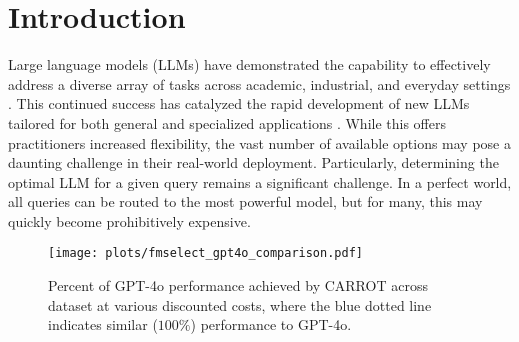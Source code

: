\section{Introduction}
\label{sec:intro}





Large language models (LLMs) have demonstrated the capability to effectively address a diverse array of tasks across academic, industrial, and everyday settings \citep{minaee2024large}. This continued success has catalyzed the rapid development of new LLMs tailored for both general and specialized applications \citep{myrzakhan2024open}. While %
this offers practitioners increased flexibility, the vast number of available options may pose a daunting challenge in their real-world deployment. Particularly, determining the optimal LLM for a given query remains a significant challenge. In a perfect world, all queries can be routed to the most powerful model, but for many, this may quickly become prohibitively expensive.

\begin{figure}[h]
    \centering
        \texttt{[image: plots/fmselect\_gpt4o\_comparison.pdf]} 
\caption{Percent of GPT-4o performance achieved by CARROT across dataset at various discounted costs, where the blue dotted line indicates similar ($100\%$) performance to GPT-4o.}
\label{fig:IBMMix-spider}
\end{figure}

